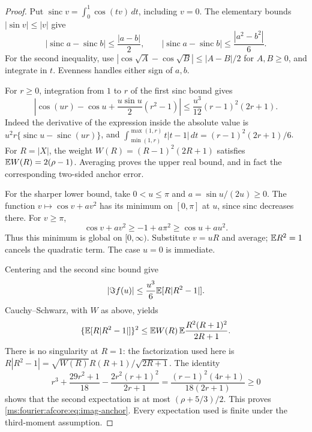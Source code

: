 \begin{proof}
Put $\operatorname{sinc}v=\int_0^1\cos(tv)\,dt$, including $v=0$.
The elementary bounds $|\sin v|\le|v|$ give
\[
 |\operatorname{sinc}a-\operatorname{sinc}b|
 \le\frac{|a-b|}{2},\qquad
 |\operatorname{sinc}a-\operatorname{sinc}b|
 \le\frac{|a^2-b^2|}{6}.
\]
For the second inequality, use
$|\cos\sqrt A-\cos\sqrt B|\le|A-B|/2$ for $A,B\ge0$,
and integrate in $t$. Evenness handles either sign of $a,b$.

For $r\ge0$, integration from $1$ to $r$ of the first sinc bound gives
\[
 \left|\cos(ur)-\cos u+
       \frac{u\sin u}{2}(r^2-1)\right|
 \le\frac{u^3}{12}(r-1)^2(2r+1).
\]
Indeed the derivative of the expression inside the absolute value is
$u^2r\{\operatorname{sinc}u-\operatorname{sinc}(ur)\}$, and
$\int_{\min(1,r)}^{\max(1,r)}t|t-1|\,dt
=(r-1)^2(2r+1)/6$.
For $R=|X|$, the weight $W(R)=(R-1)^2(2R+1)$ satisfies
$\mathbb E W(R)=2(\rho-1)$. Averaging proves the upper real bound, and in fact
the corresponding two-sided anchor error.

For the sharper lower bound, take $0<u\le\pi$ and
$a=\sin u/(2u)\ge0$. The function $v\mapsto\cos v+av^2$ has its
minimum on $[0,\pi]$ at $u$, since sinc decreases there. For $v\ge\pi$,
\[
 \cos v+av^2\ge-1+a\pi^2\ge\cos u+au^2.
\]
Thus this minimum is global on $[0,\infty)$. Substitute $v=uR$ and
average; $\mathbb E R^2=1$ cancels the quadratic term. The case $u=0$ is immediate.

Centering and the second sinc bound give
\[
 |\Im f(u)|
 \le\frac{u^3}{6}\mathbb E[R|R^2-1|].
\]
Cauchy--Schwarz, with $W$ as above, yields
\[
 \{\mathbb E[R|R^2-1|]\}^2
 \le\mathbb E W(R)\,
       \mathbb E\frac{R^2(R+1)^2}{2R+1}.
\]
There is no singularity at $R=1$: the factorization used here is
$R|R^2-1|=\sqrt{W(R)}R(R+1)/\sqrt{2R+1}$.
The identity
\[
 r^3+\frac{29r^2+1}{18}
 -\frac{2r^2(r+1)^2}{2r+1}
 =\frac{(r-1)^2(4r+1)}{18(2r+1)}\ge0
\]
shows that the second expectation is at most $(\rho+5/3)/2$.
This proves \eqref{ms:fourier:afcore:eq:imag-anchor}. Every expectation used is
finite under the third-moment assumption.
\end{proof}

